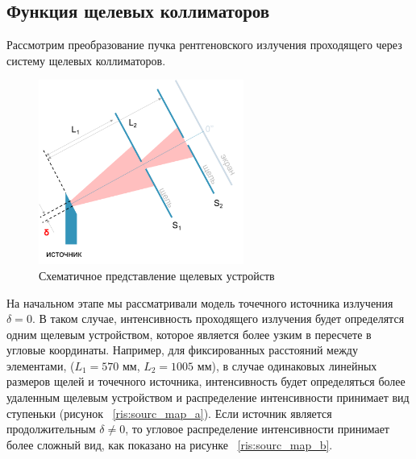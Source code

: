  \subsection{Функция щелевых коллиматоров}
 \label{sec:slits_section}
 Рассмотрим преобразование пучка рентгеновского излучения проходящего через систему щелевых коллиматоров.
 \begin{figure}[H]
   \centering
   \includegraphics[width=0.6\textwidth]{images/for_slits.png}
   \caption{Схематичное представление щелевых устройств}
   \label{ris:for_slits}
 \end{figure}

На начальном этапе мы рассматривали модель точечного источника излучения $\delta = 0$.
В таком случае, интенсивность проходящего излучения будет определятся
одним щелевым устройством, которое является более узким в пересчете в угловые
координаты. Например, для фиксированных расстояний между элементами,
($L_1 = 570$ мм, $L_2 = 1005$ мм), в случае одинаковых линейных размеров щелей и точечного
источника, интенсивность будет определяться более удаленным щелевым устройством и
распределение интенсивности принимает вид ступеньки (рисунок ~\ref{ris:sourc_map_a}). Если источник является
 продолжительным $\delta \neq 0$, то угловое распределение интенсивности принимает более сложный вид, как показано на рисунке ~\ref{ris:sourc_map_b}.



